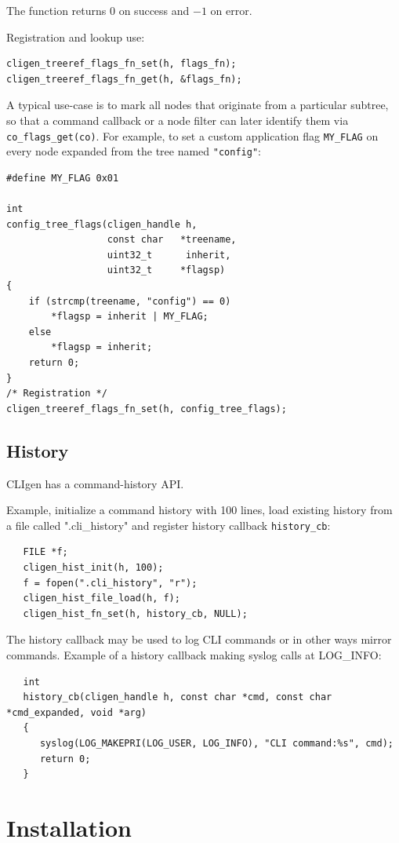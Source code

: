 \documentclass[a4paper, 10pt] {article}
\begin{document}
The function returns 0 on success and $-1$ on error.

Registration and lookup use:
\begin{verbatim}
cligen_treeref_flags_fn_set(h, flags_fn);
cligen_treeref_flags_fn_get(h, &flags_fn);
\end{verbatim}

A typical use-case is to mark all nodes that originate from a particular
subtree, so that a command callback or a node filter can later identify them
via {\tt co\_flags\_get(co)}. For example, to set a custom application flag
{\tt MY\_FLAG} on every node expanded from the tree named {\tt "config"}:
\begin{verbatim}
#define MY_FLAG 0x01

int
config_tree_flags(cligen_handle h,
                  const char   *treename,
                  uint32_t      inherit,
                  uint32_t     *flagsp)
{
    if (strcmp(treename, "config") == 0)
        *flagsp = inherit | MY_FLAG;
    else
        *flagsp = inherit;
    return 0;
}
/* Registration */
cligen_treeref_flags_fn_set(h, config_tree_flags);
\end{verbatim}

\subsection{History}

CLIgen has a command-history API.

Example, initialize a command history with 100 lines, load existing history from a file called ".cli\_history" and register history callback {\tt history\_cb}:

\begin{verbatim}
   FILE *f;
   cligen_hist_init(h, 100);
   f = fopen(".cli_history", "r");
   cligen_hist_file_load(h, f);
   cligen_hist_fn_set(h, history_cb, NULL);
\end{verbatim}

The history callback may be used to log CLI commands or in other ways mirror commands. Example of a history callback making syslog calls at LOG\_INFO:

\begin{verbatim}
   int
   history_cb(cligen_handle h, const char *cmd, const char *cmd_expanded, void *arg)
   {
      syslog(LOG_MAKEPRI(LOG_USER, LOG_INFO), "CLI command:%s", cmd);
      return 0;
   }
\end{verbatim}

\section{Installation}
\end{document}
